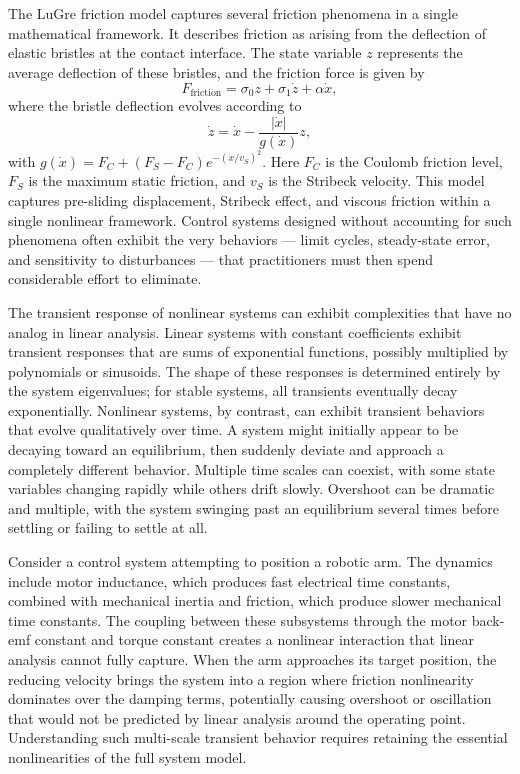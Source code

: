 The LuGre friction model captures several friction phenomena in a single mathematical framework. It describes friction as arising from the deflection of elastic bristles at the contact interface. The state variable $z$ represents the average deflection of these bristles, and the friction force is given by
\begin{equation}
F_{\text{friction}} = \sigma_0 z + \sigma_1 \dot{z} + \alpha \dot{x},
\end{equation}
where the bristle deflection evolves according to
\begin{equation}
\dot{z} = \dot{x} - \frac{|\dot{x}|}{g(\dot{x})} z,
\end{equation}
with $g(\dot{x}) = F_C + (F_S - F_C)e^{-(\dot{x}/v_S)^2}$. Here $F_C$ is the Coulomb friction level, $F_S$ is the maximum static friction, and $v_S$ is the Stribeck velocity. This model captures pre-sliding displacement, Stribeck effect, and viscous friction within a single nonlinear framework. Control systems designed without accounting for such phenomena often exhibit the very behaviors --- limit cycles, steady-state error, and sensitivity to disturbances --- that practitioners must then spend considerable effort to eliminate.

The transient response of nonlinear systems can exhibit complexities that have no analog in linear analysis. Linear systems with constant coefficients exhibit transient responses that are sums of exponential functions, possibly multiplied by polynomials or sinusoids. The shape of these responses is determined entirely by the system eigenvalues; for stable systems, all transients eventually decay exponentially. Nonlinear systems, by contrast, can exhibit transient behaviors that evolve qualitatively over time. A system might initially appear to be decaying toward an equilibrium, then suddenly deviate and approach a completely different behavior. Multiple time scales can coexist, with some state variables changing rapidly while others drift slowly. Overshoot can be dramatic and multiple, with the system swinging past an equilibrium several times before settling or failing to settle at all.

Consider a control system attempting to position a robotic arm. The dynamics include motor inductance, which produces fast electrical time constants, combined with mechanical inertia and friction, which produce slower mechanical time constants. The coupling between these subsystems through the motor back-emf constant and torque constant creates a nonlinear interaction that linear analysis cannot fully capture. When the arm approaches its target position, the reducing velocity brings the system into a region where friction nonlinearity dominates over the damping terms, potentially causing overshoot or oscillation that would not be predicted by linear analysis around the operating point. Understanding such multi-scale transient behavior requires retaining the essential nonlinearities of the full system model.

